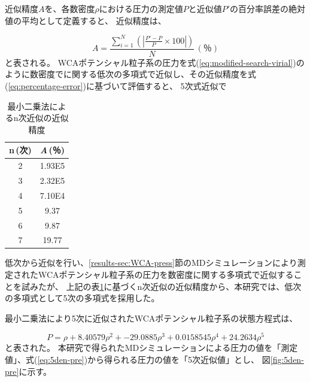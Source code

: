 \documentclass[titlepage]{jsreport}
\begin{document}
{{{近似精度$A$を、各数密度$\rho$における圧力の測定値$P$と近似値$P'$の百分率誤差の絶対値の平均として定義すると、
近似精度は、

\large
\begin{equation}
    A=\frac{\sum_{i=1}^N\left(|\frac{P'-P}{P}\times100|\right)}{N}\,(％)\label{eq:percentage-error}
\end{equation}
\normalsize
と表される。
WCAポテンシャル粒子系の圧力を式(\ref{eq:modified-search-virial})のように数密度でに関する低次の多項式で近似し、その近似精度を式(\ref{eq:percentage-error})に基づいて評価すると、
5次式近似で

\begin{table}[htbp]
    \begin{center}
        \caption{最小二乗法によるn次近似の近似精度}
        \label{table:approximation-accuracy}
            \begin{tabular}{c c}
                    n\,(次) & {\it{A}}\,(％) \\ \hline\hline
                    2 & 1.93E5 \\ 
                    3 & 2.32E5 \\ 
                    4 & 7.10E4\\ 
                    5 & 9.37\\ 
                    6 & 9.87 \\ 
                    7 & 19.77 \\ \hline
                
            \end{tabular}
    \end{center}
    
\end{table}

\newpage
低次から近似を行い、\ref{results-sec:WCA-press}節のMDシミュレーションにより測定されたWCAポテンシャル粒子系の圧力を数密度に関する多項式で近似することを試みたが、
上記の表\ref{table:approximation-accuracy}に基づくn次近似の近似精度から、本研究では、低次の多項式として5次の多項式を採用した。

最小二乗法により5次に近似されたWCAポテンシャル粒子系の状態方程式は、

\large
\begin{equation}
    P=\rho+8.40579\rho^2+-29.0885\rho^3+0.0158545\rho^4+24.2634\rho^5 \label{eq:5den-pre}
\end{equation}
\normalsize
と表された。
本研究で得られたMDシミュレーションによる圧力の値を「測定値」、式(\ref{eq:5den-pre})から得られる圧力の値を「5次近似値」とし、
図\ref{fig:5den-pre}に示す。

}}}
\end{document}
